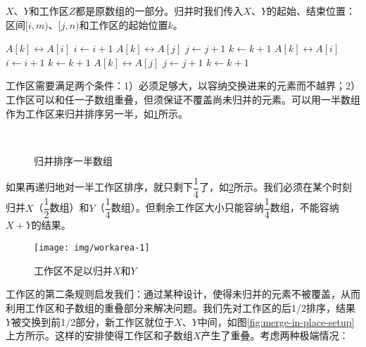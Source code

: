 \documentclass[b5paper]{ctexart}
\begin{document}
$X$、$Y$和工作区$Z$都是原数组的一部分。归并时我们传入$X$、$Y$的起始、结束位置：区间$[i, m)$、$[j, n)$和工作区的起始位置$k$。

\begin{algorithmic}[1]
\Procedure{Merge}{$A, [i, m), [j, n), k$}
      \State {} $A[k] \leftrightarrow A[i]$
      \State $i \gets i + 1$
    \Else
      \State {} $A[k] \leftrightarrow A[j]$
      \State $j \gets j + 1$
    \EndIf
    \State $k \gets k + 1$
  \EndWhile
    \State {} $A[k] \leftrightarrow A[i]$
    \State $i \gets i + 1$
    \State $k \gets k + 1$
  \EndWhile
    \State {} $A[k] \leftrightarrow A[j]$
    \State $j \gets j + 1$
    \State $k \gets k + 1$
  \EndWhile
\EndProcedure
\end{algorithmic}

工作区需要满足两个条件：1）必须足够大，以容纳交换进来的元素而不越界；2）工作区可以和任一子数组重叠，但须保证不覆盖尚未归并的元素。可以用一半数组作为工作区来归并排序另一半，如\cref{fig:merge-in-place-start}所示。

\begin{figure}[htbp]
 \centering
       \\
 \caption{归并排序一半数组}
 \label{fig:merge-in-place-start}
\end{figure}

如果再递归地对一半工作区排序，就只剩下$\dfrac{1}{4}$了，如\cref{fig:merge-in-place-quater}所示。我们必须在某个时刻归并$X$（$\dfrac{1}{2}$数组）和$Y$（$\dfrac{1}{4}$数组）。但剩余工作区大小只能容纳$\dfrac{1}{4}$数组，不能容纳$X + Y$的结果。

\begin{figure}[htbp]
 \centering
 \texttt{[image: img/workarea-1]}
 \caption{工作区不足以归并$X$和$Y$}
 \label{fig:merge-in-place-quater}
\end{figure}

工作区的第二条规则启发我们：通过某种设计，使得未归并的元素不被覆盖，从而利用工作区和子数组的重叠部分来解决问题。我们先对工作区的后1/2排序，结果$Y$被交换到前1/2部分，新工作区就位于$X$、$Y$中间，如图\cref{fig:merge-in-place-setup}上方所示。这样的安排使得工作区和子数组$X$产生了重叠\cite{msort-in-place}。考虑两种极端情况：
\end{document}
